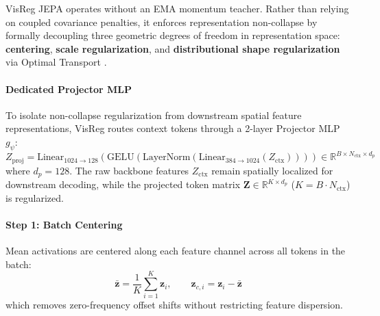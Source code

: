 \documentclass{article}
\begin{document}
VisReg JEPA \citep{wu2026visreg} operates without an EMA momentum teacher. Rather than relying on coupled covariance penalties, it enforces representation non-collapse by formally decoupling three geometric degrees of freedom in representation space: \textbf{centering}, \textbf{scale regularization}, and \textbf{distributional shape regularization} via Optimal Transport \citep{bonneel2015sliced,villani2009optimal}.

\paragraph{Dedicated Projector MLP}
To isolate non-collapse regularization from downstream spatial feature representations, VisReg routes context tokens through a 2-layer Projector MLP $g_\psi$:
\begin{equation}
    Z_{\text{proj}} = \text{Linear}_{1024 \to 128}\left(\text{GELU}\left(\text{LayerNorm}\left(\text{Linear}_{384 \to 1024}(Z_{\text{ctx}})\right)\right)\right) \in \mathbb{R}^{B \times N_{\text{ctx}} \times d_p}
\end{equation}
where $d_p = 128$. The raw backbone features $Z_{\text{ctx}}$ remain spatially localized for downstream decoding, while the projected token matrix $\mathbf{Z} \in \mathbb{R}^{K \times d_p}$ ($K = B \cdot N_{\text{ctx}}$) is regularized.

\paragraph{Step 1: Batch Centering}
Mean activations are centered along each feature channel across all tokens in the batch:
\begin{equation}
    \bar{\mathbf{z}} = \frac{1}{K} \sum_{i=1}^K \mathbf{z}_i, \qquad \mathbf{z}_{c, i} = \mathbf{z}_i - \bar{\mathbf{z}}
\end{equation}
which removes zero-frequency offset shifts without restricting feature dispersion.
\end{document}
